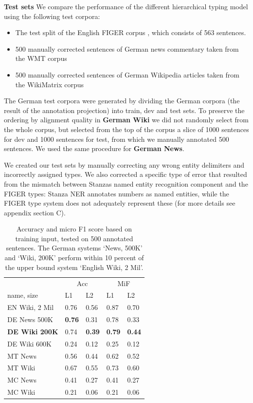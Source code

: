 \documentclass[11pt,a4paper]{article}
\begin{document}
\textbf{Test sets}
We compare the performance of the different hierarchical typing model using the following test corpora:
\begin{itemize}
\itemsep0em 
    \item The test split of the English FIGER corpus \cite{ling2012fine}, which consists of 563 sentences.
    \item 500  manually corrected sentences of German news commentary taken from the WMT corpus \cite{barrault2019findings}
    \item 500  manually corrected sentences of German Wikipedia articles taken from the WikiMatrix corpus \cite{schwenk2019wikimatrix}
\end{itemize}
The German test corpora were generated by dividing the German corpora (the result of the annotation projection) into train, dev and test sets. To preserve the ordering by alignment quality in \textbf{German Wiki} we did not randomly select from the whole corpus, but selected from the top of the corpus a slice of 1000 sentences for dev and 1000 sentences for test, from which we manually annotated 500 sentences. We used the same procedure for \textbf{German News}.

We created our test sets by manually correcting any wrong entity delimiters and incorrectly assigned types. We also corrected a specific type of error that resulted from the mismatch between Stanzas named entity recognition component and the FIGER types: Stanza NER annotates numbers as named entities, while the FIGER type system does not adequately represent these (for more details see appendix section C).

\begin{table}[h!]
\begin{tabular}{l|l|l||l|l}
 &\multicolumn{2}{c}{Acc}&\multicolumn{2}{c}{MiF} \\
name, size  &L1  & L2  &L1    &L2   \\\hline \hline
EN Wiki, 2 Mil & 0.76 & 0.56& 0.87  & 0.70 \\
\hline
DE News 500K & \textbf{0.76} &0.31& 0.78  &0.33  \\
\textbf{DE Wiki 200K } & 0.74 & \textbf{0.39}&\textbf{0.79 }&  \textbf{0.44}\\ 
DE Wiki 600K &0.24 & 0.12& 0.25  & 0.12\\
\hline
MT News & 0.56 &0.44& 0.62  &0.52\\
MT Wiki & 0.67 & 0.55& 0.73 &0.60\\
MC News & 0.41 & 0.27& 0.41  & 0.27 \\
MC Wiki &0.21 & 0.06 & 0.21  & 0.06
\end{tabular}
\caption{Accuracy and micro F1 score based on training input, tested on 500 annotated sentences. The German systems `News, 500K' and `Wiki, 200K' perform within 10 percent of the upper bound system `English Wiki, 2 Mil'.}
\label{table:results2}
\end{table}
\end{document}
